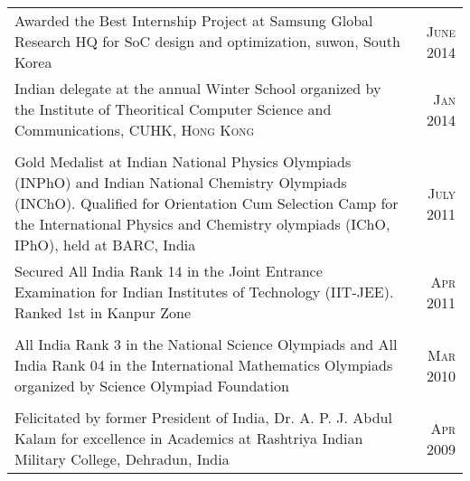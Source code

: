 \begin{tabular}{p{13.9cm}|r}
	\textbullet\hspace{1pt} Awarded the Best Internship Project at Samsung Global Research HQ for SoC design and optimization, suwon, South Korea & \textsc{June 2014} \\ 
	\textbullet\hspace{1pt} Indian delegate at the annual Winter School organized by the Institute of Theoritical Computer Science and Communications, CUHK, \textsc{Hong Kong} &\textsc{Jan 2014}\\
	\multicolumn{2}{c}{}\\
	\textbullet\hspace{1pt} Gold Medalist at Indian National Physics Olympiads (INPhO) and Indian National Chemistry Olympiads (INChO). Qualified for Orientation Cum Selection Camp for the International Physics and Chemistry olympiads (IChO, IPhO), held at BARC, India & \textsc{July 2011}\\
	\textbullet\hspace{1pt} Secured All India Rank 14 in the Joint Entrance Examination for Indian Institutes of Technology (IIT-JEE). Ranked 1st in Kanpur Zone & \textsc{Apr 2011}\\
	\multicolumn{2}{c}{}\\
	\textbullet\hspace{1pt} All India Rank 3 in the National Science Olympiads and All India Rank 04 in the International Mathematics Olympiads organized by Science Olympiad Foundation& \textsc{Mar 2010}\\
	\multicolumn{2}{c}{}\\
	\textbullet\hspace{1pt} Felicitated by former President of India, Dr. A. P. J. Abdul Kalam for excellence in Academics  at Rashtriya Indian Military College, Dehradun, India & \textsc{Apr 2009}\\
\end{tabular}
